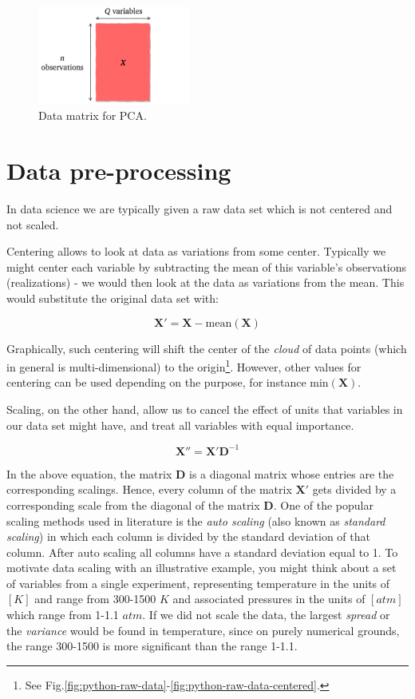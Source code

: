 \documentclass[10pt,twocolumn]{article}
\begin{document}
\begin{figure}[H]
\centering\includegraphics[width=5cm]{data-set-PCA.png}
\caption{Data matrix for PCA.}
\label{fig:data-matrix}
\end{figure}

\section{Data pre-processing}

In data science we are typically given a raw data set which is not centered and not scaled. 

Centering allows to look at data as variations from some center. Typically we might center each variable by subtracting the mean of this variable's observations (realizations) - we would then look at the data as variations from the mean. This would substitute the original data set with:

\begin{equation}
\bm{X'} = \bm{X} - \text{mean}(\bm{X})
\end{equation}

Graphically, such centering will shift the center of the \textit{cloud} of data points (which in general is multi-dimensional) to the origin\footnote{See Fig.\ref{fig:python-raw-data}-\ref{fig:python-raw-data-centered}.}. However, other values for centering can be used depending on the purpose, for instance $\text{min}(\bm{X})$.

Scaling, on the other hand, allow us to cancel the effect of units that variables in our data set might have, and treat all variables with equal importance. 

\begin{equation}
\bm{X''} = \bm{X'}\bm{D}^{-1}
\end{equation}

In the above equation, the matrix $\bm{D}$ is a diagonal matrix whose entries are the corresponding scalings. Hence, every column of the matrix $\bm{X'}$ gets divided by a corresponding scale from the diagonal of the matrix $\bm{D}$. One of the popular scaling methods used in literature is the \textit{auto scaling} (also known as \textit{standard scaling}) in which each column is divided by the standard deviation of that column. After auto scaling all columns have a standard deviation equal to 1. To motivate data scaling with an illustrative example, you might think about a set of variables from a single experiment, representing temperature in the units of $[K]$ and range from 300-1500 $K$ and associated pressures in the units of $[atm]$ which range from 1-1.1 $atm$. If we did not scale the data, the largest \textit{spread} or the \textit{variance} would be found in temperature, since on purely numerical grounds, the range 300-1500 is more significant than the range 1-1.1.
\end{document}
